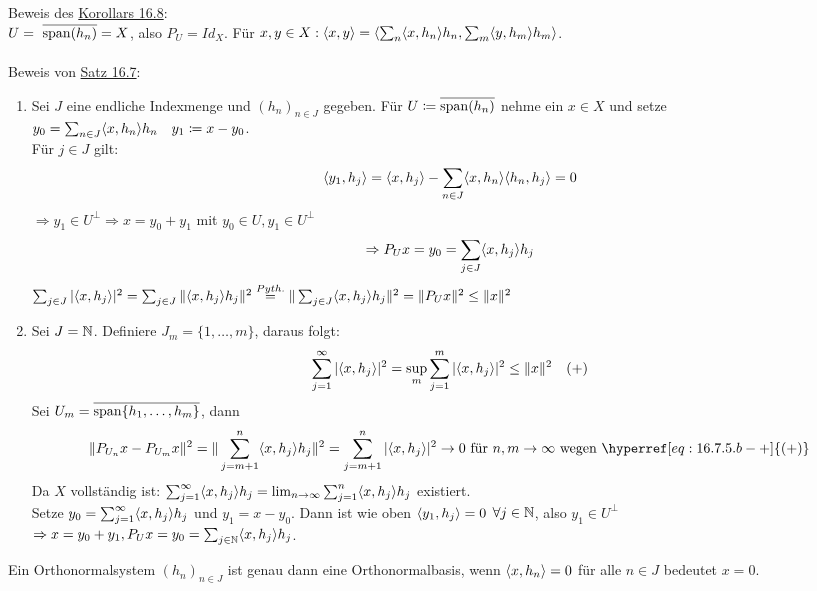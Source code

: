 \begin{beweis}
	Beweis des \hyperref[kor:16.8]{Korollars 16.8}: \\
	$U = \overline{\ospan(h_{n})} = X$, also $P_{U} = Id_{X}$. Für $x, y \in X: \langle x , y \rangle = \langle \sum_{n} \langle x , h_{n} \rangle h_{n} , \sum_{m} \langle y , h_{m} \rangle h_{m} \rangle$. \\ \\
	Beweis von \hyperref[satz:16.7]{Satz 16.7}:
	\begin{enumerate}[label=\alph*\upshape)]
		\item Sei $J$ eine endliche Indexmenge und $(h_{n})_{n \in J}$ gegeben. Für $U \coloneqq \overline{\operatorname{span}(h_{n})}$ nehme ein $x \in X$ und setze $y_{0} = \sum_{n \in J} \langle x , h_{n} \rangle h_{n} \quad y_{1} \coloneqq x - y_{0}$. \\
		Für $j \in J$ gilt:
			\[ \langle y_{1} , h_{j} \rangle = \langle x , h_{j} \rangle - \sum_{n \in J} \langle x , h_{n} \rangle \langle h_{n} , h_{j} \rangle = 0 \]
			$\Rightarrow y_{1} \in U^{\bot} \Rightarrow x = y_{0} + y_{1}$ mit $y_{0} \in U, y_{1} \in U^{\bot}$
			\[ \Rightarrow P_{U} x = y_{0} = \sum_{j \in J} \langle x , h_{j} \rangle h_{j} \]
			$\sum_{j \in J} | \langle x , h_{j} \rangle |^{2} = \sum_{j \in J} \| \langle x , h_{j} \rangle h_{j} \|^{2} \overset{Pyth.}{=} \| \sum_{j \in J} \langle x , h_{j} \rangle h_{j} \|^{2} = \| P_{U} x \|^{2} \leq \| x \|^{2}$
		\item Sei $J = \mathbb{N}$. Definiere $J_{m} = \{ 1, \dotsc, m \}$, daraus folgt:
			\[ \sum_{j = 1}^{\infty} | \langle x , h_{j} \rangle |^{2} = \sup_{m} \sum_{j = 1}^{m} | \langle x , h_{j} \rangle |^{2} \leq \| x \|^{2} \quad (+) \label{eq:16.7.5.b-+} \]
			Sei $U_{m} = \overline{\operatorname{span}\{h_{1}, \dotsc, h_{m}\}}$, dann
			\[ \| P_{U_{n}} x - P_{U_{m}} x \|^{2} = \| \sum_{j = m + 1}^{n} \< x , h_{j} \> h_{j} \|^{2} = \sum_{j = m + 1}^{n} | \< x , h_{j} \> | ^{2} \rightarrow 0 \text{ für } n, m \rightarrow \infty \text{ wegen } \hyperref[eq:16.7.5.b-+]{(+)} \]
			Da $X$ vollständig ist: $\sum_{j = 1}^{\infty} \langle x , h_{j} \rangle h_{j} = \lim_{n \rightarrow \infty} \sum_{j = 1 }^{n} \langle x , h_{j} \rangle h_{j}$ existiert. \\
			Setze $y_{0} = \sum_{j = 1}^{\infty} \langle x , h_{j} \rangle h_{j}$ und $y_{1} = x - y_{0}$. Dann ist wie oben $\langle y_{1} , h_{j} \rangle = 0$ $\forall j \in \mathbb{N}$, also $y_{1} \in U^{\bot}$ $\Rightarrow x = y_{0} + y_{1}, P_{U} x = y_{0} = \sum_{j \in \mathbb{N}} \langle x , h_{j} \rangle h_{j}$.
	\end{enumerate}
\end{beweis}


\begin{kor}
	Ein Orthonormalsystem $(h_{n})_{n \in J}$ ist genau dann eine Orthonormalbasis, wenn $\langle x, h_{n} \rangle = 0$ für alle $n \in J$ bedeutet $x = 0$. 	
\end{kor}


